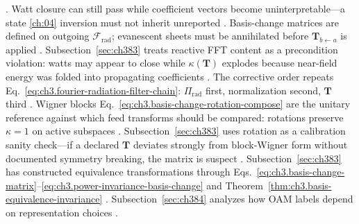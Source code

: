 \cite{devaney2004}. Watt closure can still pass while coefficient vectors become uninterpretable---a state \ref{ch:04} inversion must not inherit unreported
\cite{harrington2001}.
Basis-change matrices are defined on outgoing \(\mathcal{F}_{\mathrm{rad}}\); evanescent sheets must be annihilated before \(\mathbf{T}_{b\leftarrow a}\) is applied
\cite{stratton1941}. Subsection~\ref{sec:ch383} treats reactive FFT content as a precondition violation: watts may appear to close while \(\kappa(\mathbf{T})\) explodes because near-field energy was folded into propagating coefficients
\cite{hansen1988}. The corrective order repeats Eq.~\eqref{eq:ch3.fourier-radiation-filter-chain}: \(\Pi_{\mathrm{rad}}\) first, normalization second, \(\mathbf{T}\) third
\cite{harrington2001}.
Wigner blocks Eq.~\eqref{eq:ch3.basis-change-rotation-compose} are the unitary reference against which feed transforms should be compared: rotations preserve \(\kappa=1\) on active subspaces
\cite{jackson1999}. Subsection~\ref{sec:ch383} uses rotation as a calibration sanity check---if a declared \(\mathbf{T}\) deviates strongly from block-Wigner form without documented symmetry breaking, the matrix is suspect
\cite{harrington2001}.
Subsection~\ref{sec:ch383} has constructed equivalence transformations through
Eqs.~\eqref{eq:ch3.basis-change-matrix}--\eqref{eq:ch3.power-invariance-basis-change} and
Theorem~\ref{thm:ch3.basis-equivalence-invariance} \cite{hansen1988}. Subsection~\ref{sec:ch384} analyzes how OAM
labels depend on representation choices \cite{allen1992}.
